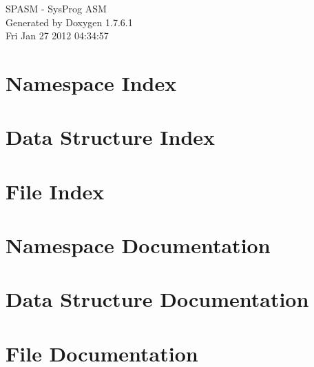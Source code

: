 \documentclass[a4paper]{book}
\begin{document}
\hypersetup{pageanchor=false,citecolor=blue}
\begin{titlepage}
\vspace*{7cm}
\begin{center}
{\Large \-S\-P\-A\-S\-M -\/ \-Sys\-Prog \-A\-S\-M }\\
\vspace*{1cm}
{\large \-Generated by Doxygen 1.7.6.1}\\
\vspace*{0.5cm}
{\small Fri Jan 27 2012 04:34:57}\\
\end{center}
\end{titlepage}
\clearemptydoublepage
{}
\tableofcontents
\clearemptydoublepage
{}
\hypersetup{pageanchor=true,citecolor=blue}
\chapter{\-Namespace \-Index}

\chapter{\-Data \-Structure \-Index}

\chapter{\-File \-Index}

\chapter{\-Namespace \-Documentation}


\chapter{\-Data \-Structure \-Documentation}






\chapter{\-File \-Documentation}













\printindex
\end{document}
